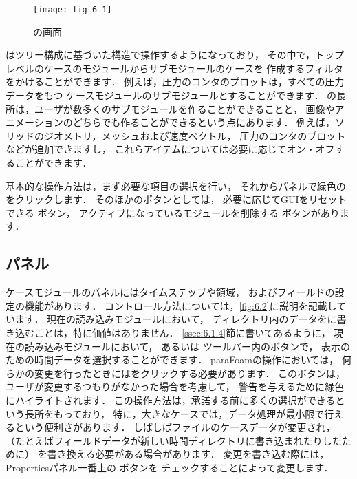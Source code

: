 \begin{figure}[ht]
 \texttt{[image: fig-6-1]}
 \caption{の画面}
 \label{fig:6.1}
\end{figure}


はツリー構成に基づいた構造で操作するようになっており，
その中で，トップレベルのケースのモジュールからサブモジュールのケースを
作成するフィルタをかけることができます．
例えば，圧力のコンタのプロットは，すべての圧力データをもつ
ケースモジュールのサブモジュールとすることができます．
の長所は，ユーザが数多くのサブモジュールを作ることができることと，
画像やアニメーションのどちらでも作ることができるという点にあります．
例えば，ソリッドのジオメトリ，メッシュおよび速度ベクトル，
圧力のコンタのプロットなどが追加できますし，
これらアイテムについては必要に応じてオン・オフすることができます．

基本的な操作方法は，まず必要な項目の選択を行い，
それからパネルで緑色の
%
%
をクリックします．
そのほかのボタンとしては，
必要に応じてGUIをリセットできる
%
%
ボタン，
アクティブになっているモジュールを削除する
%
%
ボタンがあります．


\subsection{パネル}
\label{ssec:6.1.2}
ケースモジュールのパネルにはタイムステップや領域，
およびフィールドの設定の機能があります．
コントロール方法については，\autoref{fig:6.2}に説明を記載しています．
現在の読み込みモジュールにおいて，
ディレクトリ内のデータをに書き込むことは，特に価値はありません．
\autoref{ssec:6.1.4}節に書いてあるように，
現在の読み込みモジュールにおいて，
%
%
あるいは
%
%
ツールバー内のボタンで，
表示のための時間データを選択することができます．
paraFoamの操作においては，
何らかの変更を行ったときにはをクリックする必要があります．
このボタンは，ユーザが変更するつもりがなかった場合を考慮して，
警告を与えるために緑色にハイライトされます．
この操作方法は，承諾する前に多くの選択ができるという長所をもっており，
特に，大きなケースでは，データ処理が最小限で行えるという便利さがあります．
しばしばファイルのケースデータが変更され，
（たとえばフィールドデータが新しい時間ディレクトリに書き込まれたりしたために）
を書き換える必要がある場合があります．
変更を書き込む際には，Propertiesパネル一番上の
%
%
ボタンを
チェックすることによって変更します．


